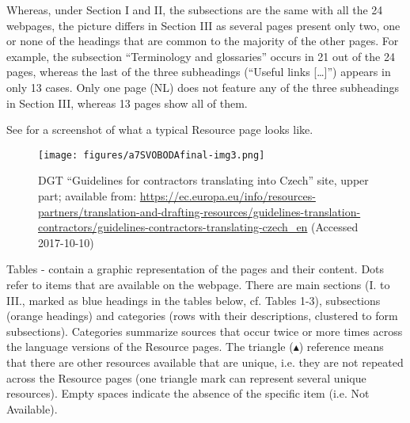 \documentclass[output=paper]{langsci/langscibook}
\begin{document}
Whereas, under Section I and II, the subsections are the same with all the 24 webpages, the picture differs in Section III as several pages present only two, one or none of the headings that are common to the majority of the other pages. For example, the subsection “Terminology and glossaries” occurs in 21 out of the 24 pages, whereas the last of the three subheadings (“Useful links […]”) appears in only 13 cases. Only one page (NL) does not feature any of the three subheadings in Section III, whereas 13 pages show all of them.

See  for a screenshot of what a typical Resource page looks like.

\begin{figure}
\caption{DGT “Guidelines for contractors translating into Czech” site, upper part; available from: \url{https://ec.europa.eu/info/resources-partners/translation-and-drafting-resources/guidelines-translation-contractors/guidelines-contractors-translating-czech_en} (Accessed 2017-10-10)}
\label{fig:svoboda:3}
\texttt{[image: figures/a7SVOBODAfinal-img3.png]}
\end{figure}

 


Tables - contain a graphic representation of the pages and their content. Dots refer to items that are available on the webpage. There are main sections (I. to III., marked as blue headings in the tables below, cf. Tables 1-3), subsections (orange headings) and categories (rows with their descriptions, clustered to form subsections). Categories summarize sources that occur twice or more times across the language versions of the Resource pages. The triangle (▴) reference means that there are other resources available that are unique, i.e. they are not repeated across the Resource pages (one triangle mark can represent several unique resources). Empty spaces indicate the absence of the specific item (i.e. Not Available). 
\end{document}
